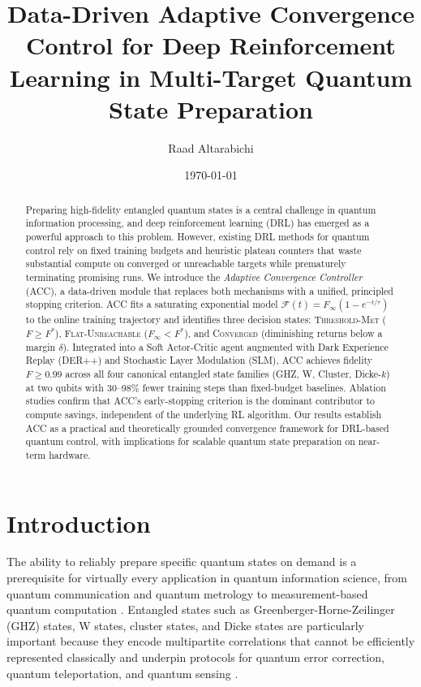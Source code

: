 \documentclass[twocolumn,superscriptaddress]{quantumarticle}
\title{Data-Driven Adaptive Convergence Control for Deep Reinforcement Learning
       in Multi-Target Quantum State Preparation}
\author{Raad Altarabichi}
\affiliation{Department of Computer Science, King Abdulaziz University, Jeddah, Saudi Arabia}
\date{\today}
\begin{document}
\maketitle

\begin{abstract}
Preparing high-fidelity entangled quantum states is a central challenge in quantum information
processing, and deep reinforcement learning (DRL) has emerged as a powerful approach to this
problem. However, existing DRL methods for quantum control rely on fixed training budgets and
heuristic plateau counters that waste substantial compute on converged or unreachable targets
while prematurely terminating promising runs. We introduce the \emph{Adaptive Convergence
Controller} (ACC), a data-driven module that replaces both mechanisms with a unified,
principled stopping criterion. ACC fits a saturating exponential model
$\mathcal{F}(t) = F_\infty(1 - e^{-t/\tau})$ to the online training trajectory and
identifies three decision states: \textsc{Threshold-Met} ($F \geq F^*$),
\textsc{Flat-Unreachable} ($F_\infty < F^*$), and \textsc{Converged}
(diminishing returns below a margin $\delta$). Integrated into a Soft Actor-Critic agent
augmented with Dark Experience Replay (DER++) and Stochastic Layer Modulation (SLM),
ACC achieves fidelity $F \geq 0.99$ across all four canonical entangled state families
(GHZ, W, Cluster, Dicke-$k$) at two qubits with 30--98\% fewer training steps than
fixed-budget baselines. Ablation studies confirm that ACC's early-stopping criterion
is the dominant contributor to compute savings, independent of the underlying RL algorithm.
Our results establish ACC as a practical and theoretically grounded convergence framework
for DRL-based quantum control, with implications for scalable quantum state preparation
on near-term hardware.
\end{abstract}

\section{Introduction}
\label{sec:intro}

The ability to reliably prepare specific quantum states on demand is a prerequisite for
virtually every application in quantum information science, from quantum communication
\cite{gisin2007quantum} and quantum metrology \cite{giovannetti2011advances} to
measurement-based quantum computation \cite{raussendorf2001one}. Entangled states such as
Greenberger-Horne-Zeilinger (GHZ) states, W states, cluster states, and Dicke states are
particularly important because they encode multipartite correlations that cannot be
efficiently represented classically and underpin protocols for quantum error correction,
quantum teleportation, and quantum sensing \cite{horodecki2009quantum}.
\end{document}
